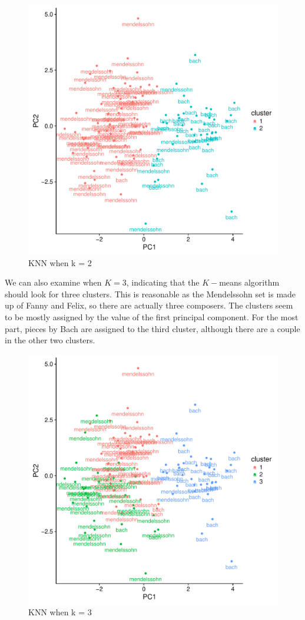 \documentclass[12pt,twoside]{reedthesis}
\theoremstyle{definition}
\theoremstyle{definition}
\theoremstyle{definition}
\theoremstyle{remark}
\begin{document}
\begin{figure}[H]
\centering
\includegraphics[scale = .5]{images/kmeans_2_b.pdf}
\caption{KNN when k = 2}
\label{subd}
\end{figure}
We can also examine when \(K=3\), indicating that the \(K-\)means
algorithm should look for three clusters. This is reasonable as the
Mendelssohn set is made up of Fanny and Felix, so there are actually
three composers. The clusters seem to be mostly assigned by the value of
the first principal component. For the most part, pieces by Bach are
assigned to the third cluster, although there are a couple in the other
two clusters.
\begin{figure}[H]
\centering
\includegraphics[scale = .5]{images/kmeans_3_b.pdf}
\caption{KNN when k = 3}
\label{subd}
\end{figure}
\end{document}
